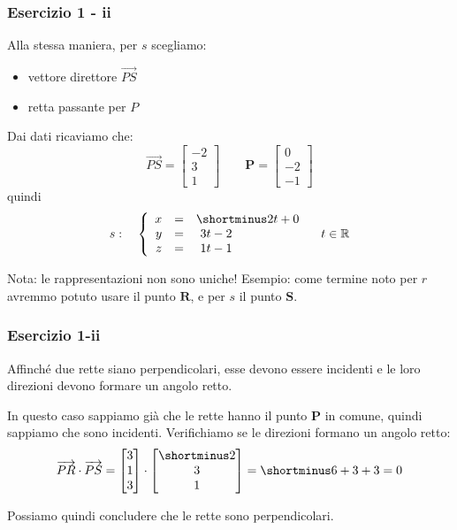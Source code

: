 \documentclass{beamer}
\begin{document}
\begin{frame}
\frametitle{Esercizio 1 - ii}

Alla stessa maniera, per $s$ scegliamo:
\begin{itemize}
        \item vettore direttore $\overrightarrow{PS}$
        \item retta passante per $P$
\end{itemize}
Dai dati ricaviamo che:
$$
\overrightarrow{PS} = \left[
\begin{array}{c}
-2\\
3\\
1
\end{array}
\right]
\qquad
\mathbf P = \left[
\begin{array}{c}
0\\
-2\\
-1
\end{array}
\right]
$$
quindi 
$$s: \quad \left\{
\begin{array}{rcl}
x&=&\shortminus 2t+0\\
y&=&\ 3t-2\\
z&=&\ 1t-1
\end{array}
\right. \quad t\in \mathbb{R}
$$

Nota: le rappresentazioni non sono uniche! Esempio: come termine noto
per $r$ avremmo potuto usare il punto $\mathbf R$, e per $s$ il punto $\mathbf S$.
\end{frame}

\begin{frame}
\frametitle{Esercizio 1-ii}
Affinch\'e due rette siano perpendicolari, esse devono essere incidenti e le loro direzioni
devono formare un angolo retto.

    \vspace{0.4cm}
In questo caso sappiamo gi\`a che le rette hanno il punto $\mathbf P$ in comune, quindi sappiamo
che sono incidenti. Verifichiamo se le direzioni formano un angolo retto:
\begin{displaymath}
\overrightarrow{PR} \cdot \overrightarrow{PS}
    =
\begin{bmatrix} 3 \\ 1 \\3 \end{bmatrix}\cdot \begin{bmatrix}\shortminus 2\\ 3 \\1 \end{bmatrix} =
    \shortminus 6 + 3 + 3 = 0
\end{displaymath}

Possiamo quindi concludere che le rette sono perpendicolari.
\end{frame}
\end{document}
